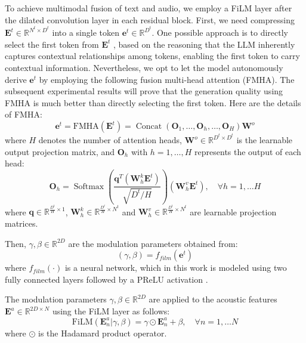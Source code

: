 \documentclass{IEEEtran}
\begin{document}
To achieve multimodal fusion of text and audio, we employ a FiLM layer \cite{perez2018film} after the dilated convolution layer in each residual block. First, we need compressing $\mathbf{E}^{t} \in \mathbb{R}^{N^t \times D^t}$ into a single token $\mathbf{e}^{t} \in \mathbb{R}^{D^t}$. One possible approach is to directly select the first token from $\mathbf{E}^{t}$ \cite{liu2024separate}, based on the reasoning that the LLM inherently captures contextual relationships among tokens, enabling the first token to carry contextual information. Nevertheless, we opt to let the model autonomously derive $\mathbf{e}^{t}$ by employing the following fusion multi-head attention (FMHA). The subsequent experimental results will prove that the generation quality using FMHA is much better than directly selecting the first token. Here are the details of FMHA:
\begin{equation}\label{eq:mha}
  \mathbf{e}^{t}=\mathrm{FMHA}(\mathbf{E}^t)=\operatorname{Concat}\left(\mathbf{O}_{1}, \ldots, \mathbf{O}_{h}, \ldots, \mathbf{O}_{H}\right) \mathbf{W}^{o}
\end{equation}
where $H$ denotes the number of attention heads, $\mathbf{W}^{o} \in \mathbb{R}^{D^t \times D^t}$ is the learnable output projection matrix, and $\mathbf{O}_h$ with $h = 1, \dots, H$ represents the output of each head:
\begin{equation}\label{eq:fmha}
    \mathbf{O}_h=\operatorname{Softmax}\left(\frac{\mathbf{q}^T\left(\mathbf{W}_h^k \mathbf{E}^t\right)}{\sqrt{D^t / H}}\right)\left(\mathbf{W}_h^v \mathbf{E}^t\right), \quad \forall h=1, \ldots H
\end{equation}
where $\mathbf{q} \in \mathbb{R}^{\frac{D^t}{H} \times 1}$, $\mathbf{W}_h^k \in \mathbb{R}^{\frac{D^t}{H} \times N^t}$ and $\mathbf{W}_h^v \in \mathbb{R}^{\frac{D^t}{H} \times N^t}$ are learnable projection matrices.

Then, $\gamma, \beta \in \mathbb{R}^{2D}$ are the modulation parameters obtained from:
\begin{equation}\label{eq:film2}
 (\gamma, \beta) = f_{film}(\mathbf{e}^{t})
\end{equation}
where $f_{film}(\cdot)$ is a neural network, which in this work is modeled using two fully connected layers followed by a PReLU activation \cite{he2015delving}.

The modulation parameters $\gamma, \beta \in \mathbb{R}^{2D}$ are applied to the acoustic features $\mathbf{E}^a \in \mathbb{R}^{2D \times N}$ using the FiLM layer as follows:
\begin{equation}\label{eq:film}
    \mathrm{FiLM}(\mathbf{E}^a_n|\gamma, \beta) = \gamma \odot \mathbf{E}^a_n + \beta, \quad \forall n=1, \ldots N
\end{equation}
where $\odot$ is the Hadamard product operator.
\end{document}
